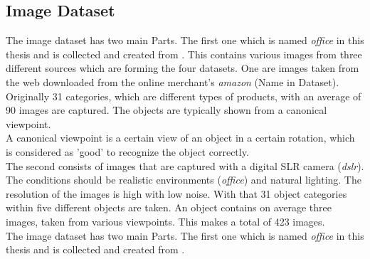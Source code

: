 \subsection{Image Dataset}\label{EmSubSecIm}
\begin{table}[]
	\centering
	\caption[Overview of key values of Image dataset]{Overview of the key figures of the Image dataset}
	\label{TableSumImage}
\end{table}
The image dataset has two main Parts. 
The first one which is named \textit{office} in this thesis and is collected and created from \cite{Saenko.2010}.
This contains various images from three different sources which are forming the four datasets.
One are images taken from the web downloaded from the online merchant's \textit{amazon} (Name in Dataset).
Originally 31 categories, which are different types of products, with an average of 90 images are captured.
The objects are typically shown from a canonical viewpoint.\\
A canonical viewpoint is a certain view of an object in a certain rotation, which is considered as 'good' to recognize the object correctly. \cite{Edelman.1991}\\
The second consists of images that are captured with a digital SLR camera (\textit{dslr}).
The conditions should be realistic environments (\textit{office}) and natural lighting.
The resolution of the images is high with low noise.
With that 31 object categories within five different objects are taken.
An object contains on average three images, taken from various viewpoints.
This makes a total of 423 images.\cite{Saenko.2010}\\
The image dataset has two main Parts. 
The first one which is named \textit{office} in this thesis and is collected and created from \cite{Saenko.2010}.
